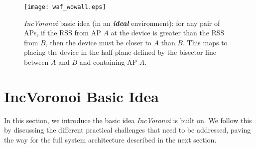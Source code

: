 \documentclass[conference]{IEEEtran}
\def \sys {\textit{IncVoronoi}}
\newcommand{\rulesep}{\vrule
}
\begin{document}
\begin{figure}[!t]
\centering
\texttt{[image: waf\_wowall.eps]}
\caption{\sys{} basic idea (in an \textbf{\emph{ideal}} environment): for any pair of APs, if the RSS from AP $A$ at the device is greater than the RSS from $B$, then the device must be closer to $A$ than $B$. This maps to placing the device in the half plane defined by the bisector line between $A$ and $B$ and containing AP $A$.}
\label{fig:half_plan}
\end{figure}

\begin{figure*}[!t]
    \hspace{0.08mm}\rulesep
    \hspace{0.08mm}\rulesep
    \hspace{0.08mm}\rulesep
    \hspace{0.08mm}
    \caption{Example of the \sys{} basic approach with four APs. Note that the order of applying the constraints does not matter and that some constraints are redundant given other constraints (e.g. constraint ($A-C$) does not reduce the user ambiguity region after applying the other constraints).}
    \label{fig:example}
  \end{figure*}
	\section{IncVoronoi Basic Idea}
\label{sec:basic}
In this section, we introduce the basic idea \sys{} is built on. We follow this by discussing the different practical challenges that need to be addressed, paving the way for the full system architecture described in the next section.
\end{document}

